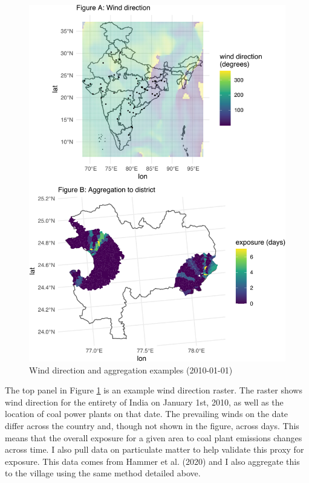 \documentclass[
]{article}
\begin{document}
\begin{figure}
\includegraphics{draft_files/figure-latex/windexample-1} \caption[Wind direction and aggregation examples (2010-01-01)]{Wind direction and aggregation examples (2010-01-01)}\label{fig:windexample}
\end{figure}

The top panel in Figure \ref{fig:windexample} is an example wind direction raster. The raster shows wind direction for the entirety of India on January 1st, 2010, as well as the location of coal power plants on that date. The prevailing winds on the date differ across the country and, though not shown in the figure, across days. This means that the overall exposure for a given area to coal plant emissions changes across time. I also pull data on particulate matter to help validate this proxy for exposure. This data comes from Hammer et al. (2020) and I also aggregate this to the village using the same method detailed above.
\end{document}
